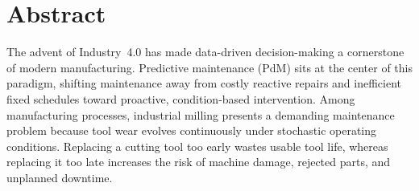 \documentclass[12pt,oneside]{book}
\begin{document}

\chapter*{Abstract}

The advent of Industry~4.0 has made data-driven decision-making a cornerstone of modern manufacturing. Predictive maintenance (PdM) sits at the center of this paradigm, shifting maintenance away from costly reactive repairs and inefficient fixed schedules toward proactive, condition-based intervention. Among manufacturing processes, industrial milling presents a demanding maintenance problem because tool wear evolves continuously under stochastic operating conditions. Replacing a cutting tool too early wastes usable tool life, whereas replacing it too late increases the risk of machine damage, rejected parts, and unplanned downtime.
\end{document}
